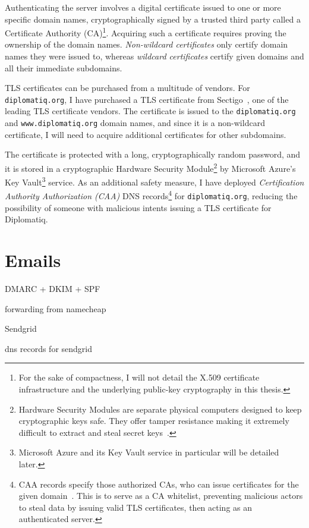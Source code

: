 Authenticating the server involves a digital certificate issued to one or more specific domain names, cryptographically signed by a trusted third party called a Certificate Authority (CA)\footnote{For the sake of compactness, I will not detail the X.509 certificate infrastructure and the underlying public-key cryptography in this thesis.}. Acquiring such a certificate requires proving the ownership of the domain names. \emph{Non-wildcard certificates} only certify domain names they were issued to, whereas \emph{wildcard certificates} certify given domains and all their immediate subdomains.

TLS certificates can be purchased from a multitude of vendors. For \lstinline{diplomatiq.org}, I have purchased a TLS certificate from Sectigo~\cite{sectigo-website}, one of the leading TLS certificate vendors. The certificate is issued to the \lstinline{diplomatiq.org} and \lstinline{www.diplomatiq.org} domain names, and since it is a non-wildcard certificate, I will need to acquire additional certificates for other subdomains.

The certificate is protected with a long, cryptographically random password, and it is stored in a cryptographic Hardware Security Module\footnote{Hardware Security Modules are separate physical computers designed to keep cryptographic keys safe. They offer tamper resistance making it extremely difficult to extract and steal secret keys~\cite{fips-140-3}.} by Microsoft Azure's Key Vault\footnote{Microsoft Azure and its Key Vault service in particular will be detailed later.} service. As an additional safety measure, I have deployed \emph{Certification Authority Authorization (CAA)} DNS records\footnote{CAA records specify those authorized CAs, who can issue certificates for the given domain~\cite{rfc8659}. This is to serve as a CA whitelist, preventing malicious actors to steal data by issuing valid TLS certificates, then acting as an authenticated server.} for \lstinline{diplomatiq.org}, reducing the possibility of someone with malicious intents issuing a TLS certificate for Diplomatiq.

\section{Emails}

DMARC + DKIM + SPF

forwarding from namecheap

Sendgrid

dns records for sendgrid

